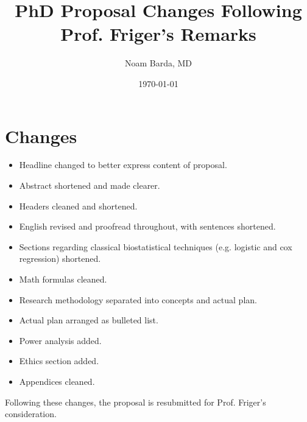\documentclass[a4paper,12pt]{article}
\title{PhD Proposal Changes Following Prof. Friger's Remarks}
\date{\today}
\author{Noam Barda, MD}
\begin{document}
	
	\maketitle
	
	\section*{Changes}
	\begin{itemize}
		\item Headline changed to better express content of proposal.
		\item Abstract shortened and made clearer.
		\item Headers cleaned and shortened.
		\item English revised and proofread throughout, with sentences shortened.
		\item Sections regarding classical biostatistical techniques (e.g. logistic and cox regression) shortened.
		\item Math formulas cleaned.
		\item Research methodology separated into concepts and actual plan.
		\item Actual plan arranged as bulleted list.
		\item Power analysis added.
		\item Ethics section added.
		\item Appendices cleaned.
	\end{itemize}

	Following these changes, the proposal is resubmitted for Prof. Friger's consideration.
		
\end{document}
